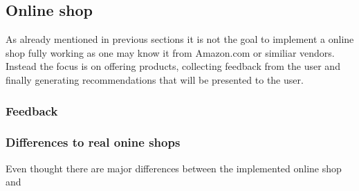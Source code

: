 
\subsection{Online shop}
As already mentioned in previous sections it is not the goal to implement a online shop fully working as one may know it from Amazon.com or similiar vendors.
Instead the focus is on offering products, collecting feedback from the user and finally generating recommendations that will be presented to the user.

\subsubsection{Feedback}

\subsubsection{Differences to real onine shops}
Even thought there are major differences between the implemented online shop and 

